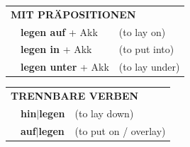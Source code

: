 \documentclass[10pt,a4paper]{revtex4-2}
\begin{document}
\begin{verbbox}
\vspace{10pt}

\begin{tabular}{lll}
\multicolumn{3}{l}{\textbf{MIT PRÄPOSITIONEN}}\\
& \textbf{legen auf} + Akk & (to lay on)\\
& \textbf{legen in} + Akk & (to put into)\\
& \textbf{legen unter} + Akk & (to lay under)\\
\end{tabular}
\hfill
\begin{tabular}{lll}
\multicolumn{3}{l}{\textbf{TRENNBARE VERBEN}}\\
& \textbf{hin$|$legen} & (to lay down)\\
& \textbf{auf$|$legen} & (to put on / overlay)\\
\end{tabular}
\vspace{-5pt}
\end{verbbox}
\end{document}
